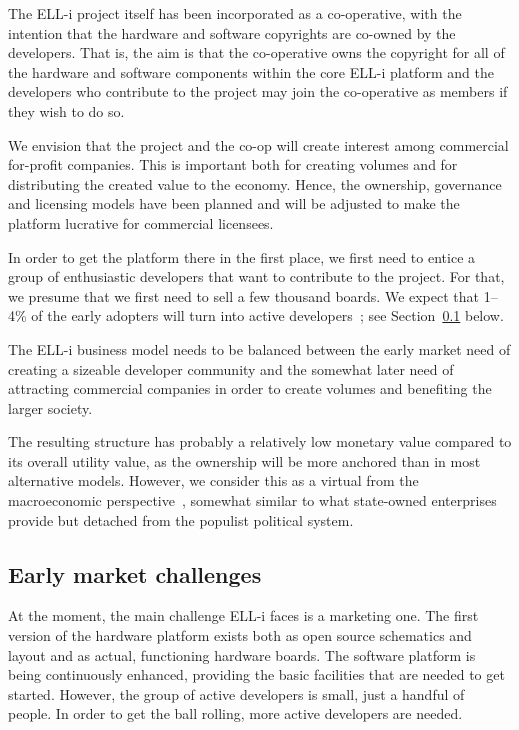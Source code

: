 \documentclass[final]{siamltex}
\begin{document}
The ELL-i project itself has been incorporated as a co-operative, with
the intention that the hardware and software copyrights are co-owned
by the developers.  That is, the aim is that the co-operative owns the
copyright for all of the hardware and software components within the
core ELL-i platform and the developers who contribute to the project
may join the co-operative as members if they wish to do so.

We envision that the project and the co-op will create interest among
commercial for-profit companies.  This is important both for creating
volumes and for distributing the created value to the economy.
Hence, the ownership, governance and licensing models have been
planned and will be adjusted to make the platform lucrative for
commercial licensees.

In order to get the platform there in the first place, we
first need to entice a group of enthusiastic developers that want to
contribute to the project.  For that, we presume that we first need to
sell a few thousand boards.  
We expect that 1--4\% of the early
adopters will turn into active developers~\cite{anderson2012makers}; see
Section~\ref{ssec:earlymarket} below.

The ELL-i business model needs to be balanced between the early
market need of creating a sizeable developer community and the
somewhat later need of attracting commercial companies in order to
create volumes and benefiting the larger society.  

The resulting structure has probably a relatively low monetary value
compared to its overall utility value, as the ownership will be more
anchored than in most alternative models. However, we consider this
as a virtual from the macroeconomic
perspective~\cite{Olson2002}, somewhat similar to what
state-owned enterprises provide but detached from the populist
political system.

\subsection{Early market challenges}
\label{ssec:earlymarket}

At the moment, the main challenge ELL-i faces is a marketing one.  The
first version of the hardware platform exists both as open source
schematics and layout and as actual, functioning hardware boards.  The
software platform is being continuously enhanced, providing the basic
facilities that are needed to get started.  However, the group of
active developers is small, just a handful of people.  
In order to get the ball rolling, more
active developers are needed.
\end{document}
